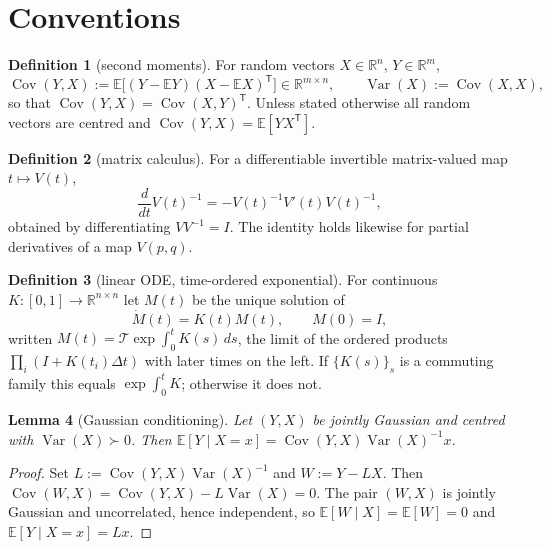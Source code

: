 \documentclass[11pt]{article}
\newtheorem{lemma}{Lemma}[section]
\theoremstyle{definition}
\newtheorem{definition}[lemma]{Definition}
\theoremstyle{remark}
\DeclareMathOperator{\Cov}{Cov}
\DeclareMathOperator{\Var}{Var}
\newcommand{\R}{\mathbb{R}}
\newcommand{\E}{\mathbb{E}}
\newcommand{\T}{\mathsf{T}}
\begin{document}
\section{Conventions}\label{sec:conv}

\begin{definition}[second moments]\label{def:conv}
For random vectors $X\in\R^{n}$, $Y\in\R^{m}$,
\[
\Cov(Y,X):=\E\big[(Y-\E Y)(X-\E X)^{\T}\big]\in\R^{m\times n},
\qquad
\Var(X):=\Cov(X,X),
\]
so that $\Cov(Y,X)=\Cov(X,Y)^{\T}$. Unless stated otherwise all random vectors are centred and
$\Cov(Y,X)=\E[YX^{\T}]$.
\end{definition}

\begin{definition}[matrix calculus]\label{def:matcalc}
For a differentiable invertible matrix-valued map $t\mapsto V(t)$,
\begin{equation}\label{eq:dinv}
\frac{d}{dt}V(t)^{-1}=-V(t)^{-1}V'(t)V(t)^{-1},
\end{equation}
obtained by differentiating $VV^{-1}=I$. The identity holds likewise for partial derivatives of a
map $V(p,q)$.
\end{definition}

\begin{definition}[linear ODE, time-ordered exponential]\label{def:texp}
For continuous $K:[0,1]\to\R^{n\times n}$ let $M(t)$ be the unique solution of
\begin{equation}\label{eq:ivp}
\dot M(t)=K(t)M(t),\qquad M(0)=I,
\end{equation}
written $M(t)=\mathcal T\exp\int_{0}^{t}K(s)\,ds$, the limit of the ordered products
$\prod_{i}(I+K(t_i)\Delta t)$ with later times on the left. If $\{K(s)\}_{s}$ is a commuting family
this equals $\exp\int_0^tK$; otherwise it does not.
\end{definition}

\begin{lemma}[Gaussian conditioning]\label{lem:gausscond}
Let $(Y,X)$ be jointly Gaussian and centred with $\Var(X)\succ0$. Then
$\E[Y\mid X=x]=\Cov(Y,X)\Var(X)^{-1}x$.
\end{lemma}

\begin{proof}
Set $L:=\Cov(Y,X)\Var(X)^{-1}$ and $W:=Y-LX$. Then
$\Cov(W,X)=\Cov(Y,X)-L\Var(X)=0$. The pair $(W,X)$ is jointly Gaussian and uncorrelated, hence
independent, so $\E[W\mid X]=\E[W]=0$ and $\E[Y\mid X=x]=Lx$.
\end{proof}
\end{document}
